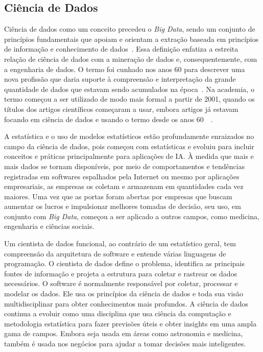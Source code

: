 \documentclass[portugues]{ic-tese}
\begin{document}
\subsection{Ciência de Dados}

Ciência de dados como um conceito precedeu o \textit{Big Data}, sendo um conjunto de princípios fundamentais que apoiam e orientam a extração baseada em princípios de informação e conhecimento de dados~\citep{Raban_2020}. Essa definição enfatiza a estreita relação de ciência de dados com a mineração de dados e, consequentemente, com a engenharia de dados. O termo foi cunhado nos anos 60 para descrever uma nova profissão que daria suporte à compreensão e interpretação da grande quantidade de dados que estavam sendo acumulados na época~\citep{Foote_2021}. Na academia, o termo começou a ser utilizado de modo mais formal a partir de 2001, quando os títulos dos artigos científicos começaram a usar, embora artigos já estavam focando em ciência de dados e usando o termo desde os anos 60~\citep{Raban_2020}~\citep{Foote_2021}. 

A estatística e o uso de modelos estatísticos estão profundamente enraizados no campo da ciência de dados, pois começou com estatísticas e evoluiu para incluir conceitos e práticas principalmente para aplicações de IA. À medida que mais e mais dados se tornam disponíveis, por meio de comportamentos e tendências registradas em softwares espalhados pela Internet ou mesmo por aplicações empresariais, as empresas os coletam e armazenam em quantidades cada vez maiores. Uma vez que as portas foram abertas por empresas que buscam aumentar os lucros e impulsionar melhores tomadas de decisão, seu uso, em conjunto com \textit{Big Data}, começou a ser aplicado a outros campos, como medicina, engenharia e ciências sociais.

Um cientista de dados funcional, ao contrário de um estatístico geral, tem compreensão da arquitetura de software e entende várias linguagens de programação. O cientista de dados define o problema, identifica as principais fontes de informação e projeta a estrutura para coletar e rastrear os dados necessários. O software é normalmente responsável por coletar, processar e modelar os dados. Ele usa os princípios da ciência de dados e toda sua visão multidisciplinar para obter conhecimentos mais profundos. A ciência de dados continua a evoluir como uma disciplina que usa ciência da computação e metodologia estatística para fazer previsões úteis e obter insights em uma ampla gama de campos. Embora seja usada em áreas como astronomia e medicina, também é usada nos negócios para ajudar a tomar decisões mais inteligentes.
\end{document}
